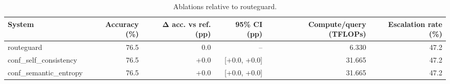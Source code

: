 \begin{table}[t]
\centering
\small
\caption{Ablations relative to routeguard.}
\label{tab:ablations}
\begin{tabular}{lrrrrr}
\toprule
System & Accuracy (\%) & Δ acc. vs ref. (pp) & 95\% CI (pp) & Compute/query (TFLOPs) & Escalation rate (\%) \\
\midrule
routeguard & 76.5 & 0.0 & -- & 6.330 & 47.2 \\
conf\_self\_consistency & 76.5 & +0.0 & [+0.0, +0.0] & 31.665 & 47.2 \\
conf\_semantic\_entropy & 76.5 & +0.0 & [+0.0, +0.0] & 31.665 & 47.2 \\
\bottomrule
\end{tabular}
\end{table}
